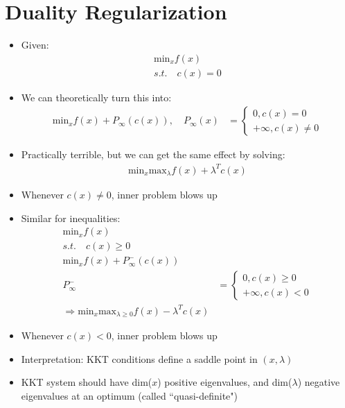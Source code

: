 \documentclass[11pt]{article}
\begin{document}
\section{Duality Regularization}
\begin{itemize}
    \item Given:
    \begin{align*}
        \text{min}_x f(x)
        \\
        s.t. \quad c(x) = 0
    \end{align*}
    \item We can theoretically turn this into:
    \begin{align*}
        \text{min}_x f(x) + P_\infty(c(x)), \quad P_\infty(x) &= \begin{cases}
            0, c(x) = 0
            \\
            +\infty, c(x) \neq 0
        \end{cases}
    \end{align*}
    \item Practically terrible, but we can get the same effect by solving:
    \begin{align*}
        \text{min}_x\text{max}_\lambda f(x) + \lambda^T c(x)
    \end{align*}
    \item Whenever $c(x)\neq 0$, inner problem blows up
    \item Similar for inequalities:
    \begin{align*}
        \text{min}_x f(x)
        \\
        s.t. \quad c(x)\geq 0
        \\
        \text{min}_x f(x) + P_\infty^{-}(c(x))
        \\
        P_\infty^{-} &= \begin{cases}
            0, c(x) \geq 0
            \\
            +\infty, c(x) < 0
        \end{cases}
        \\
        \Rightarrow \text{min}_x \text{max}_{\lambda \geq 0} f(x) - \lambda^T c(x)
    \end{align*}
    \item Whenever $c(x)<0$, inner problem blows up 
    \item Interpretation: KKT conditions define a saddle point in $(x,\lambda)$
    \item KKT system should have dim($x$) positive eigenvalues, and dim($\lambda$) negative eigenvalues at an optimum (called ``quasi-definite")

\end{itemize}
\end{document}

